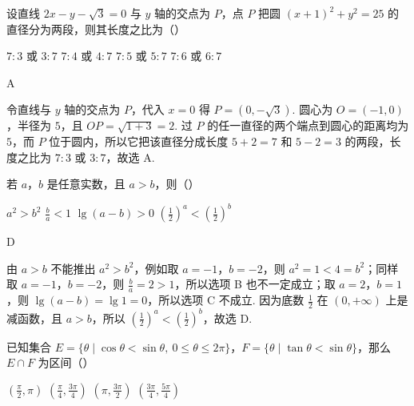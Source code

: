 \documentclass[UTF8,a4paper,oneside,11pt]{ctexbook}
\begin{document}
\begin{problem}
设直线 \(2x - y - \sqrt{3} = 0\) 与 \(y\) 轴的交点为 \(P\)，点 \(P\) 把圆 \((x + 1)^2 + y^2 = 25\) 的直径分为两段，则其长度之比为（\quad）

\choices
    {\(7:3\) 或 \(3:7\)}
    {\(7:4\) 或 \(4:7\)}
    {\(7:5\) 或 \(5:7\)}
    {\(7:6\) 或 \(6:7\)}
\end{problem}

\begin{answer}
A
\end{answer}

\begin{solution}
令直线与 \(y\) 轴的交点为 \(P\)，代入 \(x=0\) 得 \(P=(0,-\sqrt{3})\). 圆心为 \(O=(-1,0)\)，半径为 \(5\)，且 \(OP=\sqrt{1+3}=2\). 过 \(P\) 的任一直径的两个端点到圆心的距离均为 \(5\)，而 \(P\) 位于圆内，所以它把该直径分成长度 \(5+2=7\) 和 \(5-2=3\) 的两段，长度之比为 \(7:3\) 或 \(3:7\)，故选 A.
\end{solution}

\begin{problem}
若 \(a\)，\(b\) 是任意实数，且 \(a > b\)，则（\quad）

\choices
    {\(a^2 > b^2\)}
    {\(\frac{b}{a} < 1\)}
    {\(\lg (a - b) > 0\)}
    {\(\left(\frac{1}{2}\right)^a < \left(\frac{1}{2}\right)^b\)}
\end{problem}

\begin{answer}
D
\end{answer}

\begin{solution}
由 \(a>b\) 不能推出 \(a^2>b^2\)，例如取 \(a=-1\)，\(b=-2\)，则 \(a^2=1<4=b^2\)；同样取 \(a=-1\)，\(b=-2\)，则 \(\frac{b}{a}=2>1\)，所以选项 B 也不一定成立；取 \(a=2\)，\(b=1\)，则 \(\lg(a-b)=\lg1=0\)，所以选项 C 不成立. 因为底数 \(\frac{1}{2}\) 在 \((0,+\infty)\) 上是减函数，且 \(a>b\)，所以 \(\left(\frac{1}{2}\right)^a<\left(\frac{1}{2}\right)^b\)，故选 D.
\end{solution}

\begin{problem}
已知集合 \(E = \{\theta \mid \cos \theta < \sin \theta,\ 0 \leqslant \theta \leqslant 2\pi\}\)，\(F = \{\theta \mid \tan \theta < \sin \theta\}\)，那么 \(E \cap F\) 为区间（\quad）

\choices
    {\(\left(\frac{\pi}{2},\pi\right)\)}
    {\(\left(\frac{\pi}{4},\frac{3\pi}{4}\right)\)}
    {\(\left(\pi, \frac{3\pi}{2}\right)\)}
    {\(\left(\frac{3\pi}{4}, \frac{5\pi}{4}\right)\)}
\end{problem}
\end{document}
